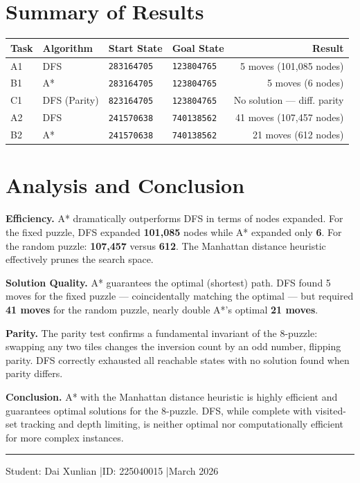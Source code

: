 \documentclass[12pt, a4paper]{article}
\begin{document}
\section{Summary of Results}

\begin{center}
\begin{tabular}{llllr}
\toprule
\textbf{Task} & \textbf{Algorithm} & \textbf{Start State} & \textbf{Goal State} & \textbf{Result} \\
\midrule
A1 & DFS            & \texttt{283164705} & \texttt{123804765} & 5 moves \quad (101,085 nodes) \\
B1 & A*             & \texttt{283164705} & \texttt{123804765} & 5 moves \quad (6 nodes) \\
C1 & DFS (Parity)   & \texttt{823164705} & \texttt{123804765} & No solution --- diff. parity \\
A2 & DFS            & \texttt{241570638} & \texttt{740138562} & 41 moves \quad (107,457 nodes) \\
B2 & A*             & \texttt{241570638} & \texttt{740138562} & 21 moves \quad (612 nodes) \\
\bottomrule
\end{tabular}
\end{center}

\section{Analysis and Conclusion}

\textbf{Efficiency.}
A* dramatically outperforms DFS in terms of nodes expanded. For the fixed puzzle, DFS expanded \textbf{101,085} nodes while A* expanded only \textbf{6}. For the random puzzle: \textbf{107,457} versus \textbf{612}. The Manhattan distance heuristic effectively prunes the search space.

\textbf{Solution Quality.}
A* guarantees the optimal (shortest) path. DFS found 5 moves for the fixed puzzle --- coincidentally matching the optimal --- but required \textbf{41 moves} for the random puzzle, nearly double A*'s optimal \textbf{21 moves}.

\textbf{Parity.}
The parity test confirms a fundamental invariant of the 8-puzzle: swapping any two tiles changes the inversion count by an odd number, flipping parity. DFS correctly exhausted all reachable states with no solution found when parity differs.

\textbf{Conclusion.}
A* with the Manhattan distance heuristic is highly efficient and guarantees optimal solutions for the 8-puzzle. DFS, while complete with visited-set tracking and depth limiting, is neither optimal nor computationally efficient for more complex instances.

\vspace{16pt}
\noindent\rule{\linewidth}{0.8pt}
\begin{center}
\small\color{gray}
Student: Dai Xunlian \quad|\quad ID: 225040015 \quad|\quad March 2026
\end{center}
\end{document}

